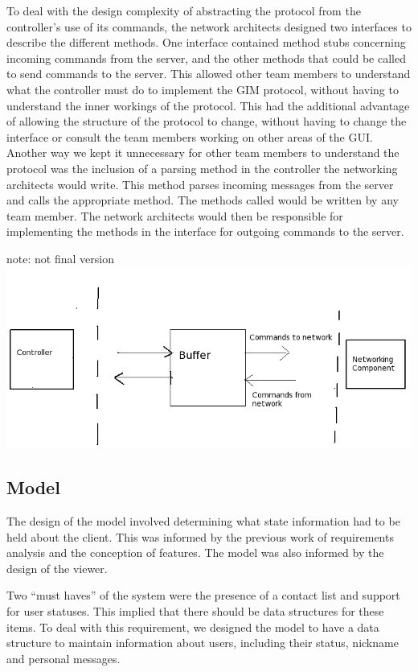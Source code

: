 To deal with the design complexity of abstracting the protocol from the controller's use of its commands, the network architects designed two interfaces to describe the different methods. One interface contained method stubs concerning incoming commands from the server, and the other methods that could be called to send commands to the server. This allowed other team members to understand what the controller must do to implement the GIM protocol, without having to understand the inner workings of the protocol. This had the additional advantage of allowing the structure of the protocol to change, without having to change the interface or consult the team members working on other areas of the GUI. Another way we kept it unnecessary for other team members to understand the protocol was the inclusion of a parsing method in the controller the networking architects would write. This method parses incoming messages from the server and calls the appropriate method. The methods called would be written by any team member. The network architects would then be responsible for implementing the methods in the interface for outgoing commands to the server.

note: not final version
\includegraphics[scale=0.65]{Design/diagrams/buffer.png}

\subsection {Model}

The design of the model involved determining what state information had to be held about the client. This was informed by the previous work of requirements analysis and the conception of features. The model was also informed by the design of the viewer.

Two ``must haves'' of the system were the presence of a contact list and support for user statuses. This implied that there should be data structures for these items. To deal with this requirement, we designed the model to have a data structure to maintain information about users, including their status, nickname and personal messages. 


